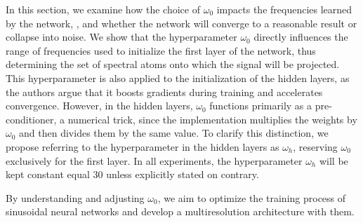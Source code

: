 

In this section, we examine how the choice of \(\omega_0\) impacts the frequencies learned by the network, , and whether the network will converge to a reasonable result or collapse into noise. We show that the hyperparameter \(\omega_0\) directly influences the range of frequencies used to initialize the first layer of the network, thus determining the set of spectral atoms onto which the signal will be projected. This hyperparameter is also applied to the initialization of the hidden layers, as the authors argue that it boosts gradients during training and accelerates convergence. However, in the hidden layers, \(\omega_0\) functions primarily as a pre-conditioner, a numerical trick, since the implementation multiplies the weights by \(\omega_0\) and then divides them by the same value. To clarify this distinction, we propose referring to the hyperparameter in the hidden layers as \(\omega_h\), reserving \(\omega_0\) exclusively for the first layer. In all experiments, the hyperparameter $\omega_h$ will be kept constant equal 30 unless explicitly stated on contrary.

By understanding and adjusting \(\omega_0\), we aim to optimize the training process of sinusoidal neural networks and develop a multiresolution architecture with them.


